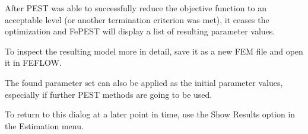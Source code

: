 After PEST was able to successfully reduce the objective function to an acceptable level (or another termination criterion was met), it ceases the optimization and FePEST will display a list of resulting parameter values.

To inspect the resulting model more in detail, save it as a new FEM file and open it in FEFLOW.

The found parameter set can also be applied as the initial parameter values, especially if further PEST methods are going to be used.

To return to this dialog at a later point in time, use the Show Results option in the Estimation menu.